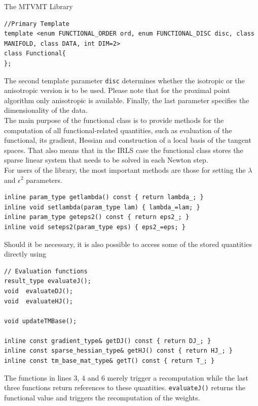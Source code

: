 \begin{chapter}{The MTVMT Library}
\cppinline
\begin{lstlisting}
//Primary Template
template <enum FUNCTIONAL_ORDER ord, enum FUNCTIONAL_DISC disc, class MANIFOLD, class DATA, int DIM=2>
class Functional{
};
\end{lstlisting}

The second template parameter \texttt{disc} determines whether the isotropic or the anisotropic version is to be used. Please note that for the proximal point algorithm only
anisotropic is available. Finally, the last parameter specifies the dimensionality of the data. \\
The main purpose of the functional class is to provide methods for the computation of all functional-related quantities, such as evaluation of the functional, its gradient,
Hessian and construction of a local basis of the tangent spaces. That also means that in the IRLS case the functional class stores the sparse linear system that needs to be solved
in each Newton step.\\

For users of the library, the most important methods are those for setting the $\lambda$ and $\epsilon^2$ parameters.
\cppinline
\begin{lstlisting}
inline param_type getlambda() const { return lambda_; }
inline void setlambda(param_type lam) { lambda_=lam; }
inline param_type geteps2() const { return eps2_; }
inline void seteps2(param_type eps) { eps2_=eps; }
\end{lstlisting}

Should it be necessary, it is also possible to access some of the stored quantities directly using
\cppinline
\begin{lstlisting}
// Evaluation functions
result_type evaluateJ();
void  evaluateDJ();
void  evaluateHJ();
 
void updateTMBase();

inline const gradient_type& getDJ() const { return DJ_; }
inline const sparse_hessian_type& getHJ() const { return HJ_; }
inline const tm_base_mat_type& getT() const { return T_; }
\end{lstlisting}
The functions in lines 3, 4 and 6 merely trigger a recomputation while the last three functions return references to these quantities. \texttt{evaluateJ()} returns the functional value and triggers the 
recomputation of the weights.




\end{chapter}
